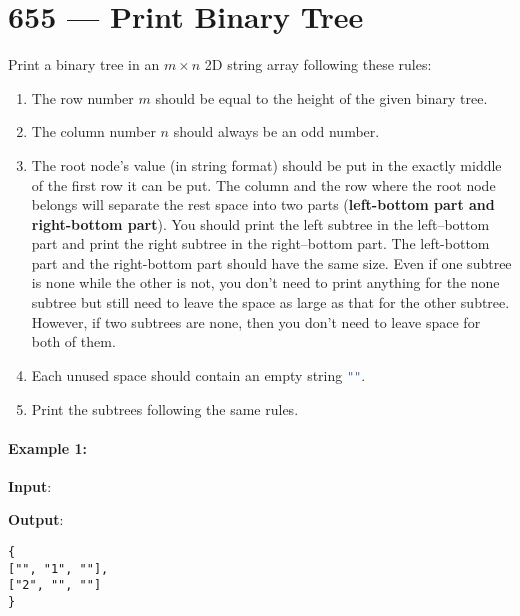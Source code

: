 \section{655 --- Print Binary Tree}
Print a binary tree in an $m\times n$ 2D string array following these rules:

\begin{enumerate}
\item The row number $m$ should be equal to the height of the given binary tree.
\item The column number $n$ should always be an odd number.
\item The root node's value (in string format) should be put in the exactly middle of the first row it can be put. The column and the row where the root node belongs will separate the rest space into two parts (\textbf{left-bottom part and right-bottom part}). You should print the left subtree in the left--bottom part and print the right subtree in the right--bottom part. The left-bottom part and the right-bottom part should have the same size. Even if one subtree is none while the other is not, you don't need to print anything for the none subtree but still need to leave the space as large as that for the other subtree. However, if two subtrees are none, then you don't need to leave space for both of them.
\item Each unused space should contain an empty string \lstinline[language=C++, basicstyle=\small\ttfamily, keywordstyle=\bfseries\color{green!40!black}]|""|.
\item Print the subtrees following the same rules.
\end{enumerate}

\paragraph{Example 1:}

\begin{flushleft}
\textbf{Input}:
\begin{figure}[H]
\end{figure}

\textbf{Output}:
\begin{lstlisting}[style=customc, caption={}]
{
["", "1", ""],
["2", "", ""]
}
\end{lstlisting}
\end{flushleft}


